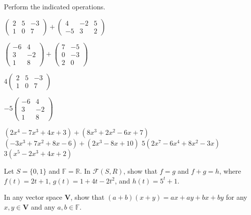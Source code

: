 \documentclass[11pt,largemargins]{homework}
\begin{document}
\question
Perform the indicated operations.
\begin{alphaparts}
    \questionpart
        $\begin{pmatrix}
            2 & 5 & -3 \\
            1 & 0 & 7 
        \end{pmatrix}
        +
        \begin{pmatrix}
            4 & -2 & 5 \\
            -5 & 3 & 2 
        \end{pmatrix}$

    \questionpart
        $\begin{pmatrix}
            -6 & 4  \\
            3 & -2  \\ 
            1 & 8
        \end{pmatrix}
        +
        \begin{pmatrix}
            7 & -5  \\
            0 & -3  \\
            2 & 0
        \end{pmatrix}$

    \questionpart
        $4 
        \begin{pmatrix}
            2 & 5 & -3 \\
            1 & 0 & 7 
        \end{pmatrix}$

    \questionpart
        $-5
        \begin{pmatrix}
            -6 & 4  \\
            3 & -2  \\
            1 & 8
        \end{pmatrix}$

    \questionpart
    $(2x^4-7x^3+4x+3)+(8x^3+2x^2-6x+7)$
    \questionpart
    $(-3x^3+7x^2+8x-6)+(2x^3-8x+10)$
    \questionpart
    $5(2x^7-6x^4+8x^2-3x)$
    \questionpart
    $3(x^5-2x^3+4x+2)$

\end{alphaparts}

\question

\question

\question
Let $S=\{0,1\}$ and $\mathbb{F}=\mathbb{R}$. In $\mathcal{F}(S,R)$, show that $f=g$ and $f+g=h$, 
where $f(t)=2t+1$, $g(t)=1+4t-2t^2$, and $h(t)=5^t+1$.

\question
In any vector space $\mathbf{V}$, show that $(a+b)(x+y)=ax+ay+bx+by$ for any $x,y \in \mathbf{V}$ and any $a,b \in \mathbb{F}$.
\end{document}
